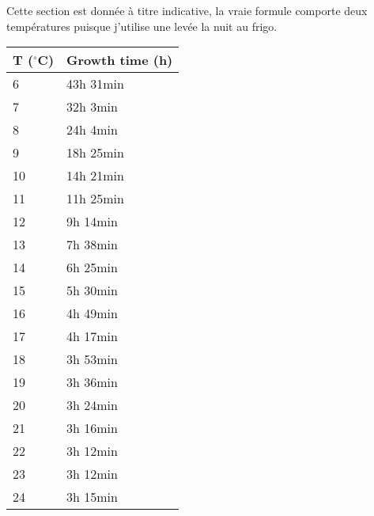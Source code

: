 \documentclass[a4paper,twoside]{article}
\begin{document}
Cette section est donnée à titre indicative, la vraie formule comporte deux températures puisque j'utilise une levée la nuit au frigo. 

\begin{center}
\begin{tabular}{|l|l|}\hline
T ($^\circ$C) & Growth time (h)\\\hline
6 & 43h 31min \\\hline
7 & 32h 3min \\\hline
8 & 24h 4min \\\hline
9 & 18h 25min \\\hline
10 & 14h 21min \\\hline
11 & 11h 25min \\\hline
12 & 9h 14min \\\hline
13 & 7h 38min \\\hline
14 & 6h 25min \\\hline
15 & 5h 30min \\\hline
16 & 4h 49min \\\hline
17 & 4h 17min \\\hline
18 & 3h 53min \\\hline
19 & 3h 36min \\\hline
20 & 3h 24min \\\hline
21 & 3h 16min \\\hline
22 & 3h 12min \\\hline
23 & 3h 12min \\\hline
24 & 3h 15min \\\hline
\end{tabular}
\end{center}


\printindex
\end{document}
